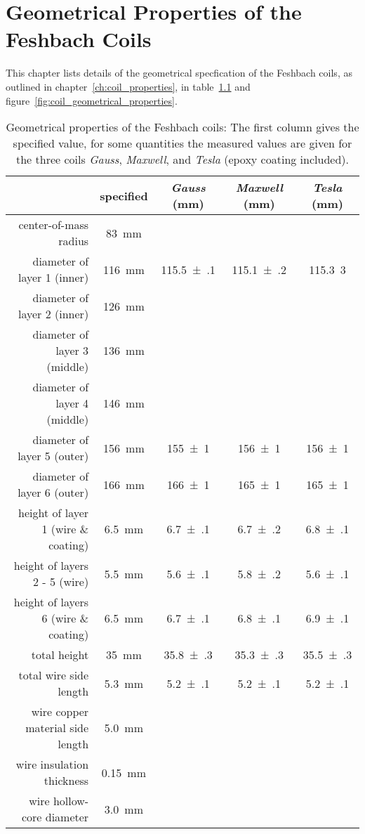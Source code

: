 \chapter{Geometrical Properties of the Feshbach Coils}\label{ch:feshbach_coil_geometrical_properties}
This chapter lists details of the geometrical specfication of the Feshbach coils, as outlined in chapter~\ref{ch:coil_properties}, in table~\ref{tab:coil_geometrical_properties} and figure~\ref{fig:coil_geometrical_properties}.
\begin{table}[h]
    \centering
    \begin{tabular}{rcccc}
        \toprule
        & \textbf{specified} & \textbf{\textit{Gauss}} (\si[]{\milli\meter}) & \textbf{\textit{Maxwell}} (\si[]{\milli\meter}) & \textbf{\textit{Tesla}} (\si[]{\milli\meter}) \\
        \toprule
        center-of-mass radius & \SI{83}{\milli\meter} &&& \\
        diameter of layer 1 (inner) & \SI{116}{\milli\meter} & \SI{115.5(1)}{}& \SI{115.1(2)}{} & \SI{115.3}{3} \\
        diameter of layer 2 (inner) & \SI{126}{\milli\meter} & && \\
        diameter of layer 3 (middle) & \SI{136}{\milli\meter} &&& \\
        diameter of layer 4 (middle) & \SI{146}{\milli\meter} &&& \\
        diameter of layer 5 (outer) & \SI{156}{\milli\meter} & \SI{155(1)}{}& \SI{156(1)}{} & \SI{156(1)}{} \\
        diameter of layer 6 (outer) & \SI{166}{\milli\meter} & \SI{166(1)}{} & \SI{165(1)}{} & \SI{165(1)}{} \\
        \midrule
        height of layer 1 (wire \& coating) & \SI{6.5}{\milli\meter} & \SI{6.7(1)}{} & \SI{6.7(2)}{} & \SI{6.8(1)}{} \\
        height of layers 2 - 5 (wire) & \SI{5.5}{\milli\meter} & \SI{5.6(1)}{} & \SI{5.8(2)}{} & \SI{5.6(1)}{} \\
        height of layers 6 (wire \& coating) & \SI{6.5}{\milli\meter} & \SI{6.7(1)}{} & \SI{6.8(1)}{} & \SI{6.9(1)}{}\\
        total height & \SI{35}{\milli\meter} & \SI{35.8(3)}{} & \SI{35.3(3)}{} & \SI{35.5(3)}{}\\
        \midrule
        total wire side length &  \SI{5.3}{\milli\meter} & \SI{5.2(1)}{} & \SI{5.2(1)}{} & \SI{5.2(1)}{}\\
        wire copper material side length & \SI{5.0}{\milli\meter} &&& \\
        wire insulation thickness & \SI{0.15}{\milli\meter} &&& \\
        wire hollow-core diameter & \SI{3.0}{\milli\meter} &&& \\
        \bottomrule
    \end{tabular}
    \caption{Geometrical properties of the Feshbach coils: The first column gives the specified value, for some quantities the measured values are given for the three coils \textit{Gauss}, \textit{Maxwell}, and \textit{Tesla} (epoxy coating included).}
    \label{tab:coil_geometrical_properties}
\end{table}

